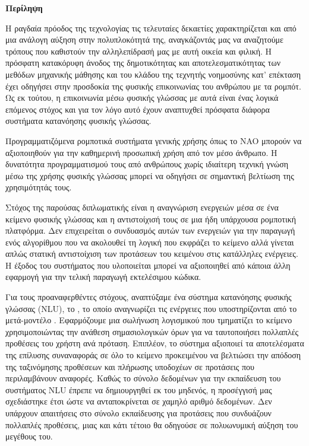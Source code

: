 \begin{center}
    \centering

    \vspace{0.3cm}
    \centering
    \textbf{\Large{Περίληψη}}

    \vspace{0.1cm}
\end{center}

Η ραγδαία πρόοδος της τεχνολογίας τις τελευταίες δεκαετίες χαρακτηρίζεται και από μια ανάλογη αύξηση στην πολυπλοκότητά της,
αναγκάζοντάς μας να αναζητούμε τρόπους που καθιστούν την αλληλεπίδρασή μας με αυτή οικεία και φιλική.
Η πρόσφατη κατακόρυφη άνοδος της δημοτικότητας και αποτελεσματικότητας των μεθόδων μηχανικής μάθησης
και του κλάδου της τεχνητής νοημοσύνης κατ' επέκταση
έχει οδηγήσει στην προσδοκία της φυσικής επικοινωνίας του ανθρώπου με τα ρομπότ.
Ως εκ τούτου, η επικοινωνία μέσω φυσικής γλώσσας με αυτά είναι ένας λογικά επόμενος στόχος και για τον λόγο αυτό έχουν αναπτυχθεί πρόσφατα διάφορα συστήματα κατανόησης φυσικής γλώσσας.

Προγραμματιζόμενα ρομποτικά συστήματα γενικής χρήσης όπως το NAO μπορούν να αξιοποιηθούν για την καθημερινή προσωπική χρήση από τον μέσο άνθρωπο.
Η δυνατότητα προγραμματισμού τους από ανθρώπους χωρίς ιδιαίτερη τεχνική γνώση μέσω της χρήσης φυσικής γλώσσας μπορεί να οδηγήσει σε σημαντική βελτίωση της χρησιμότητάς τους.

Στόχος της παρούσας διπλωματικής είναι η αναγνώριση ενεργειών μέσα σε ένα κείμενο φυσικής γλώσσας και η αντιστοίχισή τους σε μια ήδη υπάρχουσα ρομποτική πλατφόρμα.
Δεν επιχειρείται ο συνδυασμός αυτών των ενεργειών για την παραγωγή ενός αλγορίθμου που να ακολουθεί τη λογική που εκφράζει το κείμενο
αλλά γίνεται απλώς στατική αντιστοίχιση των προτάσεων του κειμένου στις κατάλληλες ενέργειες.
Η έξοδος του συστήματος που υλοποιείται μπορεί να αξιοποιηθεί από κάποια άλλη εφαρμογή για την τελική παραγωγή εκτελέσιμου κώδικα.

Για τους προαναφερθέντες στόχους, αναπτύξαμε ένα σύστημα κατανόησης φυσικής γλώσσας (NLU), το \projectname{}, το οποίο αναγνωρίζει τις ενέργειες που υποστηρίζονται από το μετά-μοντέλο \metamodel{}.
Εφαρμόζουμε μια σωλήνωση λογισμικού που τμηματίζει το κείμενο χρησιμοποιώντας την ανάθεση σημασιολογικών όρων για να ταυτοποιήσει πολλαπλές προθέσεις του χρήστη ανά πρόταση.
Επιπλέον, το σύστημα αξιοποιεί τα αποτελέσματα της επίλυσης συναναφοράς σε όλο το κείμενο προκειμένου να βελτιώσει την απόδοση της ταξινόμησης προθέσεων και πλήρωσης υποδοχέων σε προτάσεις που περιλαμβάνουν αναφορές.
Καθώς το σύνολο δεδομένων για την εκπαίδευση του συστήματος NLU έπρεπε να δημιουργηθεί εκ του μηδενός, η προσέγγισή μας σχεδιάστηκε έτσι ώστε να ανταποκρίνεται σε χαμηλό αριθμό δεδομένων.
Δεν υπάρχουν απαιτήσεις στο σύνολο εκπαίδευσης για προτάσεις που συνδυάζουν πολλαπλές προθέσεις, μιας και κάτι τέτοιο θα οδηγούσε σε πολυωνυμική αύξηση του μεγέθους του.

